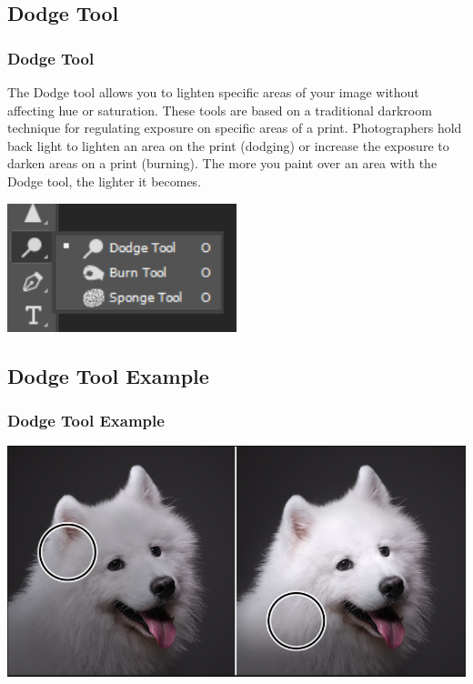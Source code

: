 \documentclass{beamer}
\begin{document}
			\subsection{Dodge Tool}		
			\begin{frame}
				\frametitle{Dodge Tool}
								\begin{outline}
					\1 The Dodge tool allows you to lighten specific areas of your image without affecting hue or saturation.
					\1 These tools are based on a traditional darkroom technique for regulating exposure on specific areas of a print.
					\1 Photographers hold back light to lighten an area on the print (dodging) or increase the exposure to darken areas on a print (burning). 
					\1 The more you paint over an area with the Dodge tool, the lighter it becomes.
				\end{outline}
			\includegraphics[width=0.5\textwidth]{images/doge and burn tools.png}
			\end{frame}
		
					\subsection{Dodge Tool Example}		
		\begin{frame}
			\frametitle{Dodge Tool Example}
			\includegraphics[width=1.0\textwidth]{images/dodge tool.png}
		\end{frame}
		
\end{document}
